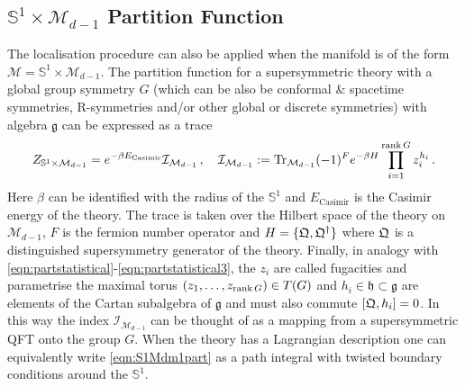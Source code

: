 \documentclass[main.tex]{subfiles}
\begin{document}
\subsection{\texorpdfstring{$\mathbb{S}^1\times\mathcal{M}_{d-1}$}{S1 x M(d-1)} Partition Function}\label{eqn:introS1xMd}
The localisation procedure can also be applied when the manifold is of the form $\mathcal{M}=\mathbb{S}^1\times\mathcal{M}_{d-1}$.  The partition function for a supersymmetric theory with a global group symmetry $G$ (which can be also be conformal \& spacetime symmetries, R-symmetries and/or other global or discrete symmetries) with algebra $\mathfrak{g}$ can be expressed as a trace \cite{Kinney:2005ej,Bhattacharya:2008zy,Romelsberger:2005eg,Witten:1982df}
\begin{equation}\label{eqn:S1Mdm1part}
Z_{\mathbb{S}^1\times\mathcal{M}_{d-1}}=e^{-\beta E_{\text{Casimir}}}\mathcal{I}_{\mathcal{M}_{d-1}}\,,\quad \mathcal{I}_{\mathcal{M}_{d-1}}:=\operatorname{Tr}_{\mathcal{M}_{d-1}}(-1)^Fe^{-\beta H}\prod_{i=1}^{\operatorname{rank} G}z_i^{h_i}\,.
\end{equation}
Here $\beta$ can be identified with the radius of the $\mathbb{S}^1$ and $ E_{\text{Casimir}}$ is the Casimir energy of the theory.  The trace is taken over the Hilbert space of the theory on $\mathcal{M}_{d-1}$, $F$ is the fermion number operator and $H=\{\mathfrak{Q},\mathfrak{Q}^{\dagger}\}$ where $\mathfrak{Q}$ is a distinguished supersymmetry generator of the theory.  Finally, in analogy with \eqref{eqn:partstatistical}-\eqref{eqn:partstatistical3}, the $z_i$ are called fugacities and parametrise the maximal torus $(z_1,\dots,z_{\operatorname{rank} G})\in T(G)$ and $h_i\in\mathfrak{h}\subset\mathfrak{g}$ are elements of the Cartan subalgebra of $\mathfrak{g}$ and must also commute $[\mathfrak{Q},h_i]=0$.  In this way the index $\mathcal{I}_{\mathcal{M}_{d-1}}$ can be thought of as a mapping from a supersymmetric QFT onto the group $G$.  When the theory has a Lagrangian description one can equivalently write \eqref{eqn:S1Mdm1part} as a path integral with twisted boundary conditions around the $\mathbb{S}^1$.
\end{document}
